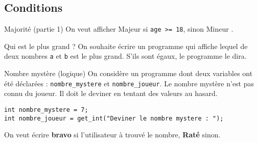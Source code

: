 \subsection{Conditions}

\begin{UPSTIexercice}{Majorité (partie 1)}
On veut afficher \og Majeur \fg{} si \verb|age >= 18|, sinon \og Mineur \fg{}.
\end{UPSTIexercice}

\begin{UPSTIexercice}{Qui est le plus grand ?}
    On souhaite écrire un programme qui affiche lequel de deux nombres \verb|a| et \verb|b| est le plus grand. S'ils sont égaux, le programme le dira. 
\end{UPSTIexercice}


\begin{UPSTIexercice}{Nombre mystère (logique)}
    On considère un programme dont deux variables ont été déclarées : \verb|nombre_mystere| et \verb|nombre_joueur|. Le nombre mystère n'est pas connu du joueur. Il doit le deviner en tentant des valeurs au hasard. 
\begin{lstlisting}
int nombre_mystere = 7; 
int nombre_joueur = get_int("Deviner le nombre mystere : ");
\end{lstlisting}
On veut écrire \textbf{bravo} si l'utilisateur à trouvé le nombre, \textbf{Raté} sinon.
\end{UPSTIexercice}
